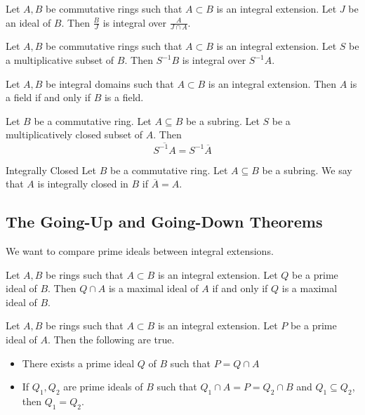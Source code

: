 \documentclass[a4paper]{article}
\begin{document}
\begin{prp}{}{} Let $A,B$ be commutative rings such that $A\subset B$ is an integral extension. Let $J$ be an ideal of $B$. Then $\frac{B}{J}$ is integral over $\frac{A}{J\cap A}$. 
\end{prp}

\begin{prp}{}{} Let $A,B$ be commutative rings such that $A\subset B$ is an integral extension. Let $S$ be a multiplicative subset of $B$. Then $S^{-1}B$ is integral over $S^{-1}A$. 
\end{prp}

\begin{lmm}{}{} Let $A,B$ be integral domains such that $A\subset B$ is an integral extension. Then $A$ is a field if and only if $B$ is a field. 
\end{lmm}

\begin{prp}{}{} Let $B$ be a commutative ring. Let $A\subseteq B$ be a subring. Let $S$ be a multiplicatively closed subset of $A$. Then $$\overline{S^{-1}A}=S^{-1}\overline{A}$$
\end{prp}

\begin{defn}{Integrally Closed}{} Let $B$ be a commutative ring. Let $A\subseteq B$ be a subring. We say that $A$ is integrally closed in $B$ if $\overline{A}=A$. 
\end{defn}

\subsection{The Going-Up and Going-Down Theorems}
We want to compare prime ideals between integral extensions. 

\begin{prp}{}{} Let $A,B$ be rings such that $A\subset B$ is an integral extension. Let $Q$ be a prime ideal of $B$. Then $Q\cap A$ is a maximal ideal of $A$ if and only if $Q$ is a maximal ideal of $B$. 
\end{prp}

\begin{prp}{}{} Let $A,B$ be rings such that $A\subset B$ is an integral extension. Let $P$ be a prime ideal of $A$. Then the following are true. 
\begin{itemize}
\item There exists a prime ideal $Q$ of $B$ such that $P=Q\cap A$
\item If $Q_1,Q_2$ are prime ideals of $B$ such that $Q_1\cap A=P=Q_2\cap B$ and $Q_1\subseteq Q_2$, then $Q_1=Q_2$. 
\end{itemize}
\end{prp}
\end{document}
